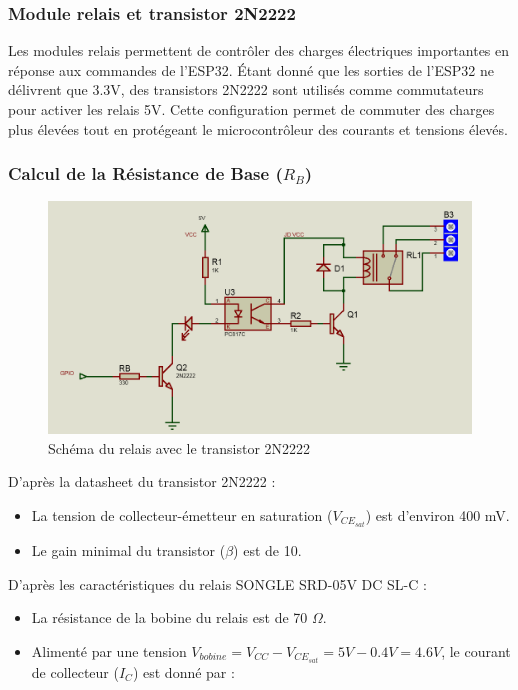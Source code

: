 \subsubsection*{Module relais et transistor 2N2222}

Les modules relais permettent de contrôler des charges électriques importantes en réponse aux commandes de l'ESP32. Étant donné que les sorties de l'ESP32 ne délivrent que 3.3V, des transistors 2N2222 sont utilisés comme commutateurs pour activer les relais 5V. Cette configuration permet de commuter des charges plus élevées tout en protégeant le microcontrôleur des courants et tensions élevés.

\subsubsection*{Calcul de la Résistance de Base (\(R_B\))}


\begin{figure}[H]
	\centering
	\includegraphics[width=13cm]{./img/composants/relaiset2n2222.PNG}
	\caption{Schéma du relais avec le transistor 2N2222}
	\label{fig:relais_5vdc}
\end{figure}

D’après la datasheet du transistor 2N2222 :
\begin{itemize}
	\item La tension de collecteur-émetteur en saturation (\(V_{CE_{sat}}\)) est d'environ 400 mV.
	\item Le gain minimal du transistor (\(\beta\)) est de 10.
\end{itemize}

D’après les caractéristiques du relais SONGLE SRD-05V DC SL-C :
\begin{itemize}
	\item La résistance de la bobine du relais est de 70 \(\Omega\).
	\item Alimenté par une tension \(V_{bobine} = V_{CC} - V_{CE_{sat}} = 5V - 0.4V = 4.6V\), le courant de collecteur (\(I_C\)) est donné par :
\end{itemize}

